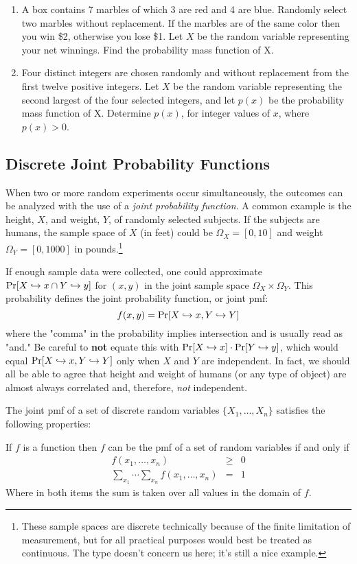\documentclass[../main.tex]{subfiles}
\begin{document}
\begin{exercises}
\begin{enumerate}
	\item %
	A box contains 7 marbles of which 3 are red and 4 are blue. Randomly select
	two marbles without replacement. If the marbles are of the same color then
	you win \$2, otherwise you lose \$1. Let $X$ be the random variable representing
	your net winnings.
	Find the probability mass function of X.
	
	\item %
	
	Four distinct integers are chosen randomly and without replacement from the
	first twelve positive integers. Let $X$ be the random variable representing the
	second largest of the four selected integers, and let $p(x)$ be the probability
	mass function of X. Determine $p(x)$, for integer values of $x$, where $p(x) > 0$.
	
	\end{enumerate}
\end{exercises}
\subsection{Discrete Joint Probability Functions}

When two or more random experiments occur simultaneously, the 
outcomes can be analyzed with the use of a \textit{joint probability
function}. A common example is the height, $X$,  and weight, $Y$, of randomly selected subjects. If the subjects are humans, the sample space of $X$ (in feet) could 
be $\Omega_X = [0,10]$ and weight $\Omega_Y = [0,1000]$ in pounds.\footnote{These
sample spaces are discrete technically because of the finite limitation
of measurement, but for all practical purposes would best be treated as
continuous. The type doesn't concern us here; it's still a nice example.}

If enough sample data were collected, one could approximate $\mathrm{Pr}[X \hookrightarrow x \cap Y \hookrightarrow y]$ for $(x,y)$ in the joint sample space $\Omega_X \times
\Omega_Y$. This probability defines the joint probability function, or joint pmf:
$$f(x,y) = \mathrm{Pr}[X \hookrightarrow x, Y \hookrightarrow Y]$$
where the "comma" in the probability implies intersection and is usually read as "and." Be careful to \textbf{not} equate this with $\mathrm{Pr}[X \hookrightarrow x]\cdot\mathrm{Pr}[Y \hookrightarrow y]$, which would equal $\mathrm{Pr}[X \hookrightarrow x, Y \hookrightarrow Y]$
only when $X$ and $Y$ are independent. In fact, we should all be able to agree that height and weight of humans (or any type of object) are
almost always correlated and, therefore, \textit{not} independent.

The joint pmf of a set of discrete random variables $\{X_1, \ldots, X_n\}$
satisfies the following properties:
\begin{theorem} If $f$ is a function then $f$ can be the pmf of a set of random variables if and only if
\begin{eqnarray}
     f(x_1,\ldots,x_n) &\geq& 0 \\
    \sum_{x_1}\cdots\sum_{x_n}f(x_1,\ldots,x_n) &=& 1
\end{eqnarray}
Where in both items the sum is taken over all values in the domain of $f$.
\end{theorem}
\end{document}

